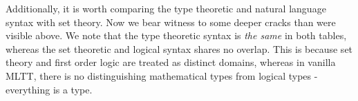


Additionally, it is worth comparing the type theoretic and natural language
syntax with set theory. Now we bear witness to some deeper cracks than were
visible above. We note that the type theoretic syntax is \emph{the same} in both
tables, whereas the set theoretic and logical syntax shares no overlap. This is
because set theory and first order logic are treated as distinct domains,
whereas in vanilla MLTT, there is no distinguishing mathematical types from
logical types - everything is a type.

